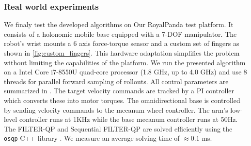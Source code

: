\vspace{0.5cm}
\subsubsection{Real world experiments}
We finaly test the developed algorithms on Our RoyalPanda test platform. It consists of a holonomic mobile base equipped with a 7-DOF manipulator. The robot's wrist mounts a 6 axis force-torque sensor and a custom set of fingers as shown in \fig\ref{fig:custom_fingers}. This hardware adaptation simplifies the problem without limiting the capabilities of the platform. We run the presented algorithm on a Intel Core i7-8550U quad-core processor (1.8 GHz, up to 4.0 GHz) and use 8 threads for parallel forward sampling of rollouts. All control parameters are summarized in \tab {}. The target velocity commands are tracked by a PI controller which converts these into motor torques. The omnidirectional base is controlled by sending velocity commands to the mecanum wheel controller. The arm's low-level controller runs at 1KHz while the base mecanum controller runs at 50Hz. The FILTER-QP and Sequential FILTER-QP are solved efficiently using the \texttt{osqp} C++ library \cite{osqp}. We measure an average solving time of $\approx 0.1$ ms.  

